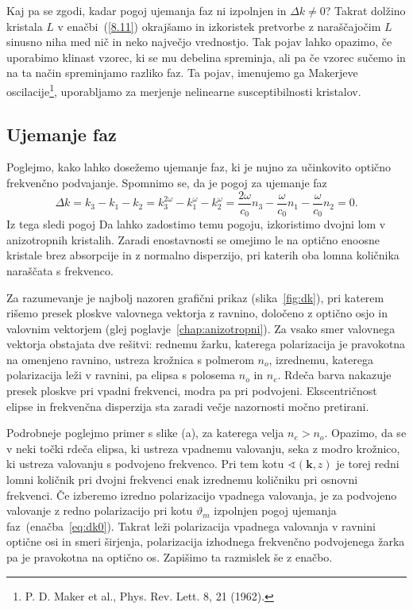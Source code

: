 Kaj pa se zgodi, kadar pogoj ujemanja faz ni izpolnjen in 
 $\Delta k \neq 0$? Takrat dolžino kristala $L$ v enačbi~(\ref{8.11})
okrajšamo in izkoristek pretvorbe z naraščajočim
$L$ sinusno niha med nič in neko največjo vrednostjo. Tak pojav lahko opazimo, če
uporabimo klinast vzorec, ki se mu debelina spreminja, ali pa če vzorec sučemo 
in na ta način spreminjamo razliko faz. Ta pojav, imenujemo ga Makerjeve 
oscilacije\footnote{P. D. Maker et al., Phys. Rev. Lett. 8, 21 (1962).}, 
uporabljamo za merjenje nelinearne susceptibilnosti kristalov.

\subsection*{Ujemanje faz}
Poglejmo, kako lahko dosežemo ujemanje faz, ki je nujno za učinkovito optično
frekvenčno podvajanje. Spomnimo se, da je pogoj za ujemanje faz 
\begin{equation}
\Delta k = k_3 - k_1 -k_2 = k_3^{2\omega} - k_1^{\omega} -k_2^\omega = 
\frac{2\omega}{c_0} n_3 - \frac{\omega}{c_0} n_1- \frac{\omega}{c_0} n_2 =0.
\end{equation}
Iz tega sledi pogoj
Da lahko zadostimo temu pogoju, izkoristimo dvojni lom v 
anizotropnih kristalih. Zaradi enostavnosti se omejimo le na optično 
enoosne kristale brez absorpcije in z normalno disperzijo, 
pri katerih oba lomna količnika naraščata s frekvenco.  

Za razumevanje je najbolj nazoren grafični prikaz (slika~\ref{fig:dk}), pri katerem
rišemo presek ploskve valovnega vektorja z ravnino, določeno z optično osjo in valovnim
vektorjem (glej poglavje~\ref{chap:anizotropni}). 
Za vsako smer valovnega vektorja obstajata dve rešitvi:
rednemu žarku, katerega polarizacija je pravokotna na omenjeno ravnino,
ustreza krožnica s polmerom $n_o$, izrednemu, katerega polarizacija leži v ravnini, 
pa elipsa s polosema $n_o$ in $n_e$. 
Rdeča barva nakazuje presek ploskve pri vpadni frekvenci, modra pa pri podvojeni. 
Ekscentričnost elipse in frekvenčna disperzija sta zaradi večje nazornosti močno 
pretirani. 

Podrobneje poglejmo primer s slike (a), za katerega velja $n_e>n_o$. 
Opazimo, da se v neki točki rdeča elipsa, ki ustreza vpadnemu valovanju, seka
z modro krožnico, ki ustreza valovanju s podvojeno frekvenco. Pri tem kotu 
$\sphericalangle (\mathbf{k}, z)$ je torej redni lomni 
količnik pri dvojni frekvenci enak izrednemu količniku pri osnovni
frekvenci. Če izberemo izredno polarizacijo vpadnega valovanja, je za podvojeno 
valovanje z redno polarizacijo pri kotu $\vartheta_m$ izpolnjen pogoj ujemanja 
faz~(enačba~\ref{eq:dk0}). Takrat leži polarizacija vpadnega valovanja v ravnini 
optične osi in smeri širjenja, polarizacija izhodnega frekvenčno podvojenega žarka pa 
je pravokotna na optično os. Zapišimo ta razmislek še z enačbo.

